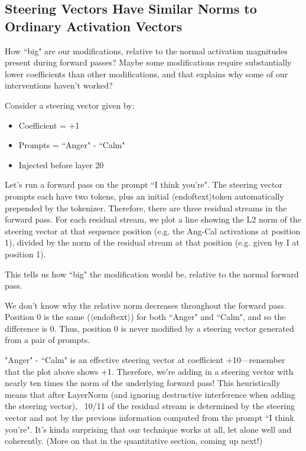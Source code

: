 \documentclass[10pt]{article}
\newcommand{\eot}{$\langle$\textbar endoftext\textbar$\rangle$}
\begin{document}
\subsection{Steering Vectors Have Similar Norms to Ordinary Activation Vectors}
How ``big" are our modifications, relative to the normal activation magnitudes present during forward passes? Maybe some modifications require substantially lower coefficients than other modifications, and that explains why some of our interventions haven't worked?

Consider a steering vector given by:

\begin{itemize}
\item Coefficient = $+$1
\item Prompts = ``Anger" - ``Calm"
\item Injected before layer 20
\end{itemize}

Let's run a forward pass on the prompt ``I think you're". The steering vector prompts each have two tokens, plus an initial \eot token automatically prepended by the tokenizer. Therefore, there are three residual streams in the forward pass. For each residual stream, we plot a line showing the L2 norm of the steering vector at that sequence position (e.g. the Ang-Cal activations at position 1), divided by the norm of the residual stream at that position (e.g. given by I at position 1). 

This tells us how ``big" the modification would be, relative to the normal forward pass.

We don't know why the relative norm decreases throughout the forward pass. Position 0 is the same (\eot) for both ``Anger" and ``Calm", and so the difference is 0. Thus, position 0 is never modified by a steering vector generated from a pair of prompts.

"Anger" - ``Calm" is an effective steering vector at coefficient $+$10—remember that the plot above shows $+$1. Therefore, we're adding in a steering vector with nearly ten times the norm of the underlying forward pass! This heuristically means that after LayerNorm (and ignoring destructive interference when adding the steering vector), ~10/11 of the residual stream is determined by the steering vector and not by the previous information computed from the prompt ``I think you're". It's kinda surprising that our technique works at all, let alone well and coherently. (More on that in the quantitative section, coming up next!)
\end{document}
